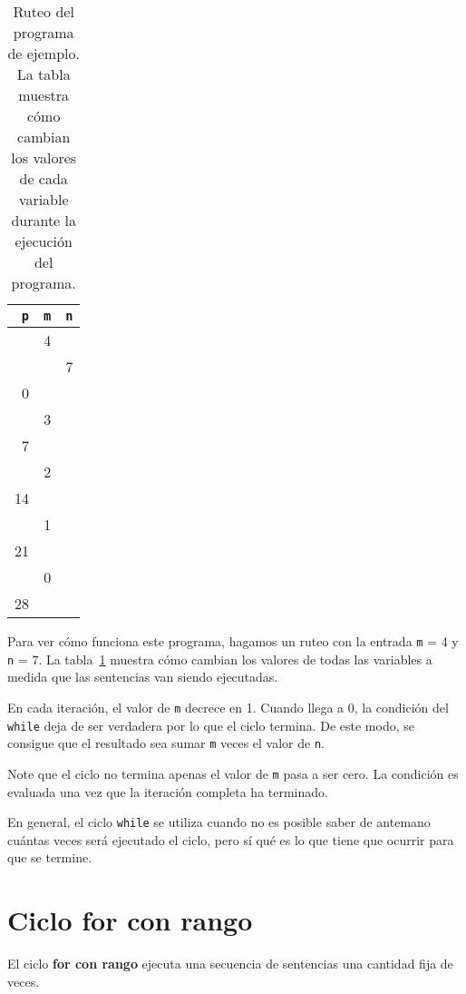 \begin{table}
  \centering
  \begin{tabular}{*{3}{r}}
    \toprule
      \lstinline!p! & \lstinline!m! & \lstinline!n! \\
    \midrule
         &  4 &   \\
         &    & 7 \\
       0 &    &   \\
         &  3 &   \\
       7 &    &   \\
         &  2 &   \\
      14 &    &   \\
         &  1 &   \\
      21 &    &   \\
         &  0 &   \\
      28 &    &   \\
    \bottomrule
  \end{tabular}
  \caption{%
    Ruteo del programa de ejemplo.
    La tabla muestra cómo cambian los valores de cada variable
    durante la ejecución del programa.
  }
  \label{tbl:ruteo-while}
\end{table}

Para ver cómo funciona este programa, hagamos un ruteo con la entrada
\lstinline!m! = 4 y \lstinline!n! = 7.
La tabla~\ref{tbl:ruteo-while} muestra cómo cambian
los valores de todas las variables
a medida que las sentencias van siendo ejecutadas.

En cada iteración, el valor de \lstinline!m! decrece en 1. Cuando llega
a 0, la condición del \lstinline!while! deja de ser verdadera por lo que
el ciclo termina. De este modo, se consigue que el resultado sea sumar
\lstinline!m! veces el valor de \lstinline!n!.

Note que el ciclo no termina apenas el valor de \lstinline!m! pasa a ser
cero. La condición es evaluada una vez que la iteración completa ha
terminado.

En general, el ciclo \lstinline!while! se utiliza cuando no es posible
saber de antemano cuántas veces será ejecutado el ciclo, pero sí qué es
lo que tiene que ocurrir para que se termine.

\section{Ciclo for con rango}

El ciclo \textbf{for con rango} ejecuta una secuencia de sentencias una
cantidad fija de veces.

